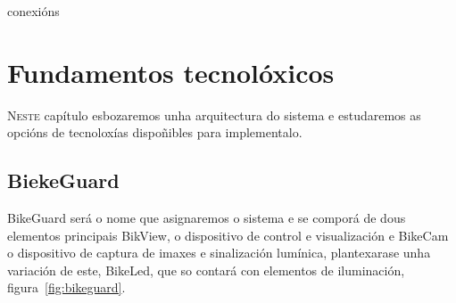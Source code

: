 conexións\chapter{Fundamentos tecnolóxicos}
\label{chap:fundamentos_tecnoloxicos}

\lettrine{N}{este} capítulo esbozaremos unha arquitectura do sistema e estudaremos as opcións de tecnoloxías dispoñibles para implementalo.

\section{BiekeGuard}

BikeGuard será o nome que asignaremos o sistema e se comporá de dous elementos principais BikView, o dispositivo de control e visualización e BikeCam o dispositivo de captura de imaxes e sinalización lumínica, plantexarase unha variación de este, BikeLed, que so contará con elementos de iluminación, figura~\ref{fig:bikeguard}.


